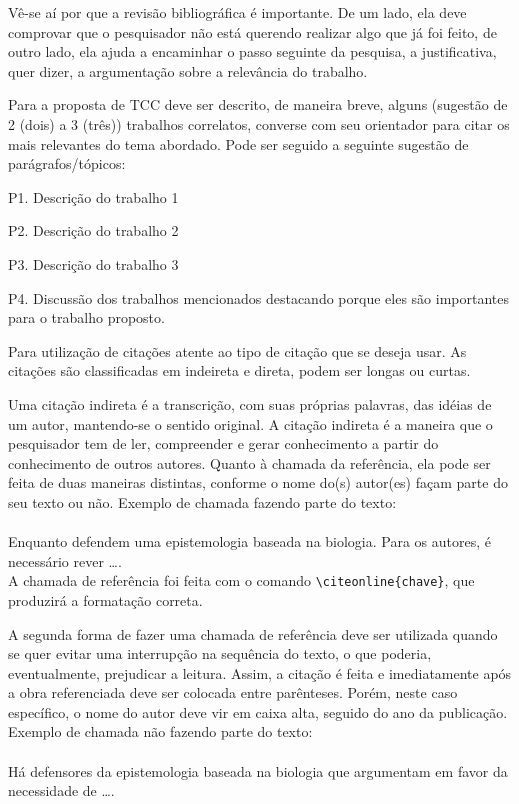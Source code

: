 Vê-se aí por que a revisão bibliográfica é importante. De um lado, ela deve comprovar que o pesquisador não está querendo realizar algo que já foi feito, de outro lado, ela ajuda a encaminhar o passo seguinte da pesquisa, a justificativa, quer dizer, a argumentação sobre a relevância do trabalho.

Para a proposta de TCC deve ser descrito, de maneira breve, alguns (sugestão de 2 (dois) a 3 (três)) trabalhos correlatos, converse com seu orientador para citar os mais relevantes do tema abordado. Pode ser seguido a seguinte sugestão de parágrafos/tópicos:

P1. Descrição do trabalho 1

P2. Descrição do trabalho 2

P3. Descrição do trabalho 3

P4. Discussão dos trabalhos mencionados destacando porque eles são importantes para o trabalho proposto.

Para utilização de citações atente ao tipo de citação que se deseja usar. As citações são classificadas em indeireta e direta, podem ser longas ou curtas.

Uma citação indireta é a transcrição, com suas próprias palavras, das idéias de um autor, mantendo-se o sentido original. A citação indireta é a maneira que o pesquisador tem de ler, compreender e gerar conhecimento a partir do conhecimento de outros autores. Quanto à chamada da referência, ela pode ser feita de duas maneiras distintas, conforme o nome do(s) autor(es) façam parte do seu texto ou não. Exemplo de chamada fazendo parte do texto:\\
\\Enquanto {} defendem uma epistemologia baseada na biologia. Para os autores, é necessário rever \ldots.\\

A chamada de referência foi feita com o comando \verb|\citeonline{chave}|, que produzirá a formatação correta.

A segunda forma de fazer uma chamada de referência deve ser utilizada quando se quer evitar uma interrupção na sequência do texto, o que poderia, eventualmente, prejudicar a leitura. Assim, a citação é feita e imediatamente após a obra referenciada deve ser colocada entre parênteses. Porém, neste caso específico, o nome do autor deve vir em caixa alta, seguido do ano da publicação. Exemplo de chamada não fazendo parte do texto:\\
\\Há defensores da epistemologia baseada na biologia que argumentam em favor da necessidade de \ldots \cite{Maturana2003}.\\

